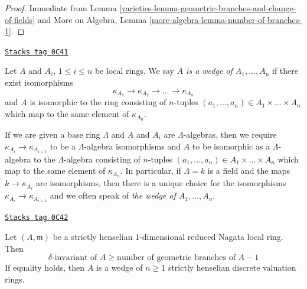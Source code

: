 \begin{proof}

Immediate from
Lemma \ref{varieties-lemma-geometric-branches-and-change-of-fields}
and More on Algebra, Lemma \ref{more-algebra-lemma-number-of-branches-1}.
\end{proof}

\begin{definition}[Wedge]
\label{varieties-definition-wedge}
\href{https://stacks.math.columbia.edu/tag/0C41}{\texttt{Stacks tag 0C41}}

Let $A$ and $A_i$, $1 \leq i \leq n$ be local rings. We say
{\it $A$ is a wedge of $A_1, \ldots, A_n$}
if there exist isomorphisms
$$
\kappa_{A_1} \to \kappa_{A_2} \to \ldots \to \kappa_{A_n}
$$
and $A$ is isomorphic to the ring consisting of $n$-tuples
$(a_1, \ldots, a_n) \in A_1 \times \ldots \times A_n$ which map to the
same element of $\kappa_{A_n}$.
\end{definition}

If we are given a base ring $\Lambda$ and $A$ and $A_i$ are $\Lambda$-algebras,
then we require $\kappa_{A_i} \to \kappa_{A_{i + 1}}$
to be a $\Lambda$-algebra isomorphisms
and $A$ to be isomorphic as a $\Lambda$-algebra to the $\Lambda$-algebra
consisting  of $n$-tuples
$(a_1, \ldots, a_n) \in A_1 \times \ldots \times A_n$ which map to the
same element of $\kappa_{A_n}$. In particular, if $\Lambda = k$ is a field
and the maps $k \to \kappa_{A_i}$ are isomorphisms, then
there is a unique choice for the isomorphisms
$\kappa_{A_i} \to \kappa_{A_{i + 1}}$ and
we often speak of {\it the wedge of $A_1, \ldots, A_n$}.

\begin{lemma}
\label{varieties-lemma-delta-number-branches-inequality-sh}
\href{https://stacks.math.columbia.edu/tag/0C42}{\texttt{Stacks tag 0C42}}

Let $(A, \mathfrak m)$ be a strictly henselian
$1$-dimensional reduced Nagata local ring. Then
$$
\delta\text{-invariant of }A \geq \text{number of geometric branches of }A - 1
$$
If equality holds, then $A$ is a wedge of $n \geq 1$ strictly henselian
discrete valuation rings.
\end{lemma}

